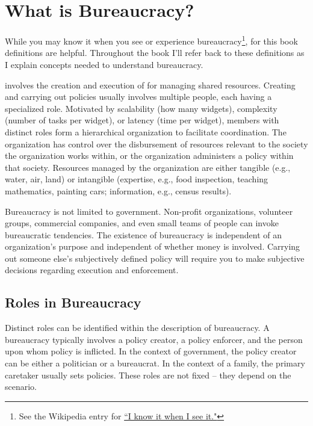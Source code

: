 \section{What is Bureaucracy?\label{sec:define-bureaucracy}}

While you may know it when you see or experience bureaucracy\footnote{See the Wikipedia entry for \href{https://en.wikipedia.org/wiki/I_know_it_when_I_see_it}{``I know it when I see it."}}, for this book definitions are helpful. Throughout the book I'll refer back to these definitions as I explain concepts needed to understand bureaucracy.

\iftoggle{glossaryinmargin}{\marginpar{[Glossary]}}{}
\iftoggle{glossarysubstitutionworks}{\Gls{bureaucracy}}{Bureaucracy} involves the creation and execution of 
\iftoggle{glossarysubstitutionworks}{\glspl{policy}}{policies} for managing shared resources. 
Creating and carrying out policies usually involves multiple people, each having a specialized role. Motivated by scalability (how many widgets), complexity (number of tasks per widget), or latency (time per widget), members with distinct roles form a hierarchical organization to facilitate coordination. The organization has control over the disbursement of resources relevant to the society the organization works within, or the organization administers a policy within that society. Resources managed by the organization are either tangible (e.g., water, air, land) or intangible (expertise, e.g., food inspection, teaching mathematics, painting cars; information, e.g., census results).  

Bureaucracy is not limited to government. Non-profit organizations, volunteer groups, commercial companies, and even small teams of people can invoke bureaucratic tendencies. The existence of bureaucracy is independent of an organization's purpose and independent of whether money is involved. Carrying out someone else's subjectively defined policy will require you to make subjective decisions regarding execution and enforcement. 

\subsection*{Roles in Bureaucracy}

Distinct roles can be identified within the description of bureaucracy.
A bureaucracy typically involves a policy creator, a policy enforcer, and the person upon whom policy is inflicted. In the context of government, the policy creator can be either a politician or a bureaucrat. In the context of a family, the primary caretaker usually sets policies. These roles are not fixed -- they depend on the scenario. 

